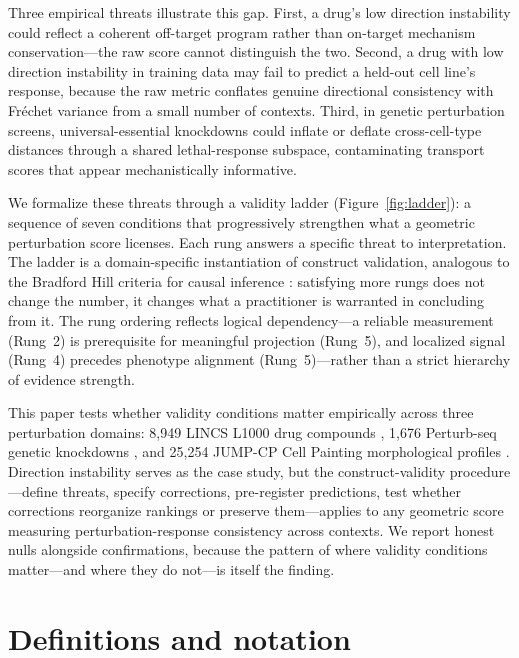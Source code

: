 \documentclass[11pt]{article}
\begin{document}
Three empirical threats illustrate this gap. First, a drug's low direction
instability could reflect a coherent off-target program rather than
on-target mechanism conservation---the raw score cannot distinguish the
two. Second, a drug with low direction instability in training data may
fail to predict a held-out cell line's response, because the raw metric
conflates genuine directional consistency with Fr\'echet variance from a
small number of contexts. Third, in genetic perturbation screens,
universal-essential knockdowns could inflate or deflate cross-cell-type
distances through a shared lethal-response subspace, contaminating
transport scores that appear mechanistically informative.

We formalize these threats through a validity ladder
(Figure~\ref{fig:ladder}): a sequence of seven conditions that
progressively strengthen what a geometric perturbation score licenses.
Each rung answers a specific threat to interpretation. The ladder is a
domain-specific instantiation of construct validation, analogous to the
Bradford Hill criteria for causal inference
\citep{freiesleben2025benchmarking}: satisfying more rungs does not change
the number, it changes what a practitioner is warranted in concluding
from it. The rung ordering reflects logical dependency---a reliable
measurement (Rung~2) is prerequisite for meaningful projection (Rung~5),
and localized signal (Rung~4) precedes phenotype alignment (Rung~5)---rather
than a strict hierarchy of evidence strength.

This paper tests whether validity conditions matter empirically across three
perturbation domains: 8{,}949 LINCS L1000 drug compounds
\citep{subramanian2017next}, 1{,}676 Perturb-seq genetic knockdowns
\citep{replogle2022mapping}, and 25{,}254 JUMP-CP Cell Painting morphological
profiles \citep{chandrasekaran2023jump}. Direction instability serves as
the case study, but the construct-validity procedure---define threats,
specify corrections, pre-register predictions, test whether corrections
reorganize rankings or preserve them---applies to any geometric score
measuring perturbation-response consistency across contexts. We report
honest nulls alongside confirmations, because the pattern of where
validity conditions matter---and where they do not---is itself the finding.

\section{Definitions and notation}
\end{document}
